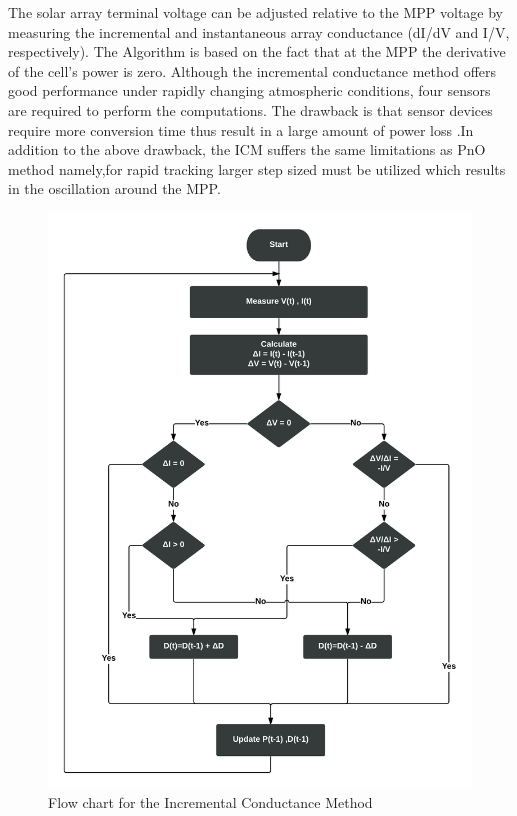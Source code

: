 {  The  solar array terminal  voltage  can  be  adjusted relative to the MPP voltage by measuring the incremental and instantaneous  array  conductance (dI/dV and I/V, respectively). The Algorithm is based on the fact that at the \ac{MPP} the derivative of the cell's power is zero. Although  the  incremental  conductance method offers good performance under rapidly changing atmospheric  conditions,  four  sensors  are  required to perform the computations. The  drawback is that sensor devices require  more  conversion  time  thus  result in a large amount of power loss \cite{gomathy2012design}.In addition to the above drawback, the \ac{ICM} suffers the same limitations as \ac{PnO} method namely,for rapid tracking larger step sized must be utilized which results in the oscillation around the \ac{MPP}. \\
  
   \begin{figure}[H]
      \begin{center}
      \includegraphics[width=\textwidth]{images/INc_flow}
      \caption{ Flow chart for the Incremental Conductance Method}
      \label{fig:inCflow}
      \end{center}
      \end{figure}
      
}
